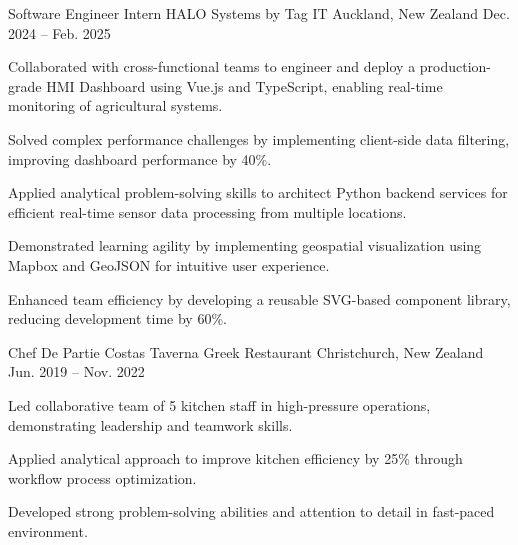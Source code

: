 \documentclass[11pt, a4paper]{awesome-cv}
\begin{document}
\begin{cventries}
  \cventry
    {Software Engineer Intern} %
    {HALO Systems by Tag IT} %
    {Auckland, New Zealand} %
    {Dec. 2024 -- Feb. 2025} %
    {
      \begin{cvitems}
        \item {Collaborated with cross-functional teams to engineer and deploy a production-grade HMI Dashboard using Vue.js and TypeScript, enabling real-time monitoring of agricultural systems.}
        \item {Solved complex performance challenges by implementing client-side data filtering, improving dashboard performance by 40\%.}
        \item {Applied analytical problem-solving skills to architect Python backend services for efficient real-time sensor data processing from multiple locations.}
        \item {Demonstrated learning agility by implementing geospatial visualization using Mapbox and GeoJSON for intuitive user experience.}
        \item {Enhanced team efficiency by developing a reusable SVG-based component library, reducing development time by 60\%.}
      \end{cvitems}
    }
  \cventry
    {Chef De Partie} %
    {Costas Taverna Greek Restaurant} %
    {Christchurch, New Zealand} %
    {Jun. 2019 -- Nov. 2022} %
    {
      \begin{cvitems}
        \item {Led collaborative team of 5 kitchen staff in high-pressure operations, demonstrating leadership and teamwork skills.}
        \item {Applied analytical approach to improve kitchen efficiency by 25\% through workflow process optimization.}
        \item {Developed strong problem-solving abilities and attention to detail in fast-paced environment.}
      \end{cvitems}
    }
\end{cventries}
\end{document}
